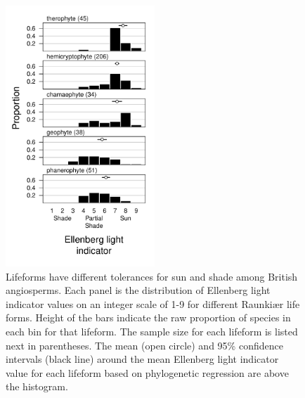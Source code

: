 \documentclass[12pt, oneside]{article}
\begin{document}
\begin{figure}[ht]
\centerline{\includegraphics[width=0.5\textwidth]{Figures/Figure_lf-light.pdf}}
\caption{Lifeforms have different tolerances for sun and shade among British angiosperms. Each panel is the distribution of Ellenberg light indicator values on an integer scale of 1-9 for different Raunki\ae r life forms. Height of the bars indicate the raw proportion of species in each bin for that lifeform. The sample size for each lifeform is listed next in parentheses. The mean (open circle) and 95\% confidence intervals (black line) around the mean Ellenberg light indicator value for each lifeform based on phylogenetic regression are above the histogram.} 
\label{fig:lf-light}
\end{figure}
\end{document}
